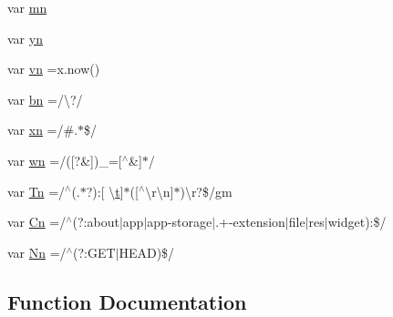 \begin{DoxyCompactItemize}
\item 
var \hyperlink{obj_2_release_2_package_2_package_tmp_2_scripts_2jquery-1_810_82_8min_8js_a227fb8e4dbaed5a772526c7e9bb0795f}{mn}
\item 
var \hyperlink{obj_2_release_2_package_2_package_tmp_2_scripts_2jquery-1_810_82_8min_8js_a390d7ca752a48e31e8ffb5209c0a4cd6}{yn}
\item 
var \hyperlink{obj_2_release_2_package_2_package_tmp_2_scripts_2jquery-1_810_82_8min_8js_a4d3ea42bab8c1a36105c29b5a098a050}{vn} =x.\+now()
\item 
var \hyperlink{obj_2_release_2_package_2_package_tmp_2_scripts_2jquery-1_810_82_8min_8js_ac1a6899002e156376de301d5f5fa36d8}{bn} =/\textbackslash{}?/
\item 
var \hyperlink{obj_2_release_2_package_2_package_tmp_2_scripts_2jquery-1_810_82_8min_8js_a5d600963c6441f15f548bc0b847b6a04}{xn} =/\#.$\ast$\$/
\item 
var \hyperlink{obj_2_release_2_package_2_package_tmp_2_scripts_2jquery-1_810_82_8min_8js_aaa87ec69cc4d144180280e906cac73f1}{wn} =/(\mbox{[}?\&\mbox{]})\+\_\+=\mbox{[}$^\wedge$\&\mbox{]}$\ast$/
\item 
var \hyperlink{obj_2_release_2_package_2_package_tmp_2_scripts_2jquery-1_810_82_8min_8js_a2a743fa90b7bc233019c5b720ccde5cc}{Tn} =/$^\wedge$(.$\ast$?)\+:\mbox{[} \textbackslash{}\hyperlink{_scripts_2jquery_8validate_8min_8js_a23c5666e83bbbceee94adcd0851f50c4}{t}\mbox{]}$\ast$(\mbox{[}$^\wedge$\textbackslash{}r\textbackslash{}n\mbox{]}$\ast$)\textbackslash{}r?\$/gm
\item 
var \hyperlink{obj_2_release_2_package_2_package_tmp_2_scripts_2jquery-1_810_82_8min_8js_ab832fcb3f80f807f0b65d1e3b4904de8}{Cn} =/$^\wedge$(?\+:about$\vert$app$\vert$app-\/storage$\vert$.+-\/extension$\vert$file$\vert$res$\vert$widget)\+:\$/
\item 
var \hyperlink{obj_2_release_2_package_2_package_tmp_2_scripts_2jquery-1_810_82_8min_8js_a03586bb881647685652f72d98d189ed0}{Nn} =/$^\wedge$(?\+:G\+E\+T$\vert$H\+E\+A\+D)\$/
\end{DoxyCompactItemize}


\subsection{Function Documentation}
\hypertarget{obj_2_release_2_package_2_package_tmp_2_scripts_2jquery-1_810_82_8min_8js_ada4b4d9ce9b76d68aeaf886e5325561f}{}
